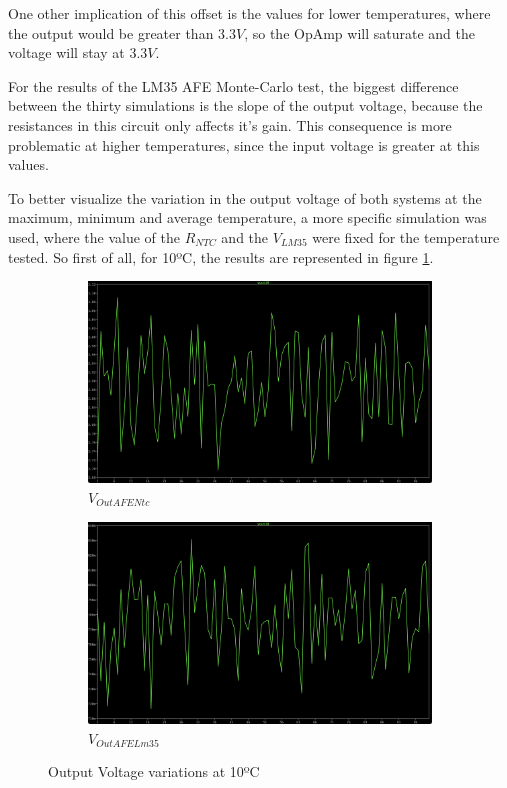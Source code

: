 \documentclass[12pt]{article}
\begin{document}
    One other implication of this offset is the values for lower temperatures, where the output would be greater than $3.3V$, so the OpAmp will saturate and the voltage will stay at $3.3V$.

    For the results of the LM35 AFE Monte-Carlo test, the biggest difference between the thirty simulations is the slope of the output voltage,
    because the resistances in this circuit only affects it's gain. This consequence is more problematic at higher temperatures, since the input voltage is greater at this values.

    To better visualize the variation in the output voltage of both systems at the maximum, minimum and average temperature, a more specific simulation was used, where the value of the $R_{NTC}$ and the
    $V_{LM35}$ were fixed for the temperature tested.
    So first of all, for 10ºC, the results are represented in figure \ref{10ºC - montecarlo}.

    \begin{figure}[H]
        \centering
        \begin{subfigure}{0.45\textwidth}
            \centering
            \includegraphics[width=\textwidth]{images/vntc10.png}
            \caption{ $V_{OutAFENtc}$ }
        \end{subfigure}\hfill
        \begin{subfigure}{0.45\textwidth}
            \centering
            \includegraphics[width=\textwidth]{images/vlm10.png}
            \caption{$V_{OutAFELm35}$}
        \end{subfigure}
        \caption{Output Voltage variations at 10ºC}
        \label{10ºC - montecarlo}
    \end{figure}
\end{document}
